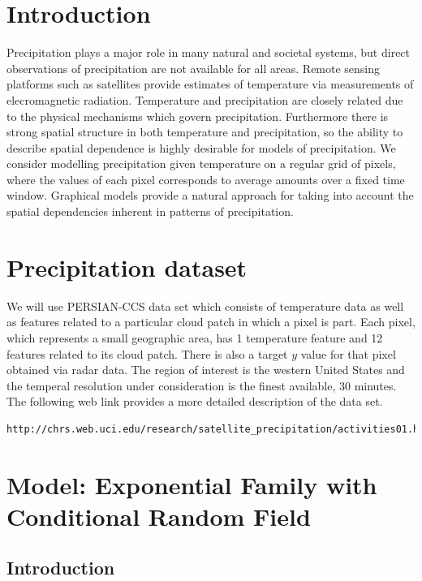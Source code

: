 
\section{Introduction}
Precipitation plays a major role in many natural and societal systems, but direct observations of precipitation are not available for all areas. Remote sensing platforms such as satellites provide estimates of temperature via measurements of elecromagnetic radiation. Temperature and precipitation are closely related due to the physical mechanisms which govern precipitation. Furthermore there is strong spatial structure in both temperature and precipitation, so the ability to describe spatial dependence is highly desirable for models of precipitation. We consider modelling precipitation given temperature on a regular grid of pixels, where the values of each pixel corresponds to average amounts over a fixed time window. Graphical models provide a natural approach for taking into account the spatial dependencies inherent in patterns of precipitation.

\section{Precipitation dataset}
We will use PERSIAN-CCS data set which consists of temperature data as well as features related to a particular cloud patch in which a pixel is part. Each pixel, which represents a small geographic area, has 1 temperature feature and 12 features related to its cloud patch. There is also a target $y$ value for that pixel obtained via radar data. The region of interest is the western United States and the temperal resolution under consideration is the finest available, 30 minutes. The following web link provides a more detailed description of the data set. 

\begin{lstlisting}
http://chrs.web.uci.edu/research/satellite_precipitation/activities01.html
\end{lstlisting}



\section{Model: Exponential Family with Conditional Random Field}

\subsection{Introduction}

